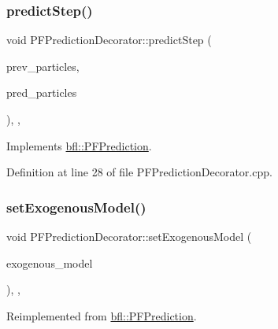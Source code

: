 \subsubsection{\texorpdfstring{predict\+Step()}{predictStep()}}
{\footnotesize\ttfamily void P\+F\+Prediction\+Decorator\+::predict\+Step (\begin{DoxyParamCaption}\item[{const \mbox{\hyperlink{classbfl_1_1ParticleSet}{bfl\+::\+Particle\+Set}} \&}]{prev\+\_\+particles,  }\item[{\mbox{\hyperlink{classbfl_1_1ParticleSet}{bfl\+::\+Particle\+Set}} \&}]{pred\+\_\+particles }\end{DoxyParamCaption})\hspace{0.3cm}{\ttfamily [override]}, {\ttfamily [protected]}, {\ttfamily [virtual]}}



Implements \mbox{\hyperlink{classbfl_1_1PFPrediction_ade49953e2beed6d12f9716254ccbba71}{bfl\+::\+P\+F\+Prediction}}.



Definition at line 28 of file P\+F\+Prediction\+Decorator.\+cpp.

\mbox{\label{classbfl_1_1PFPredictionDecorator_a3c38ae386456ecd0fd1b609b381395ec}} 
\subsubsection{\texorpdfstring{set\+Exogenous\+Model()}{setExogenousModel()}}
{\footnotesize\ttfamily void P\+F\+Prediction\+Decorator\+::set\+Exogenous\+Model (\begin{DoxyParamCaption}\item[{std\+::unique\+\_\+ptr$<$ \mbox{\hyperlink{classbfl_1_1ExogenousModel}{Exogenous\+Model}} $>$}]{exogenous\+\_\+model }\end{DoxyParamCaption})\hspace{0.3cm}{\ttfamily [override]}, {\ttfamily [protected]}, {\ttfamily [virtual]}}



Reimplemented from \mbox{\hyperlink{classbfl_1_1PFPrediction_ada843698204584e97d4ff6728c8e8264}{bfl\+::\+P\+F\+Prediction}}.



